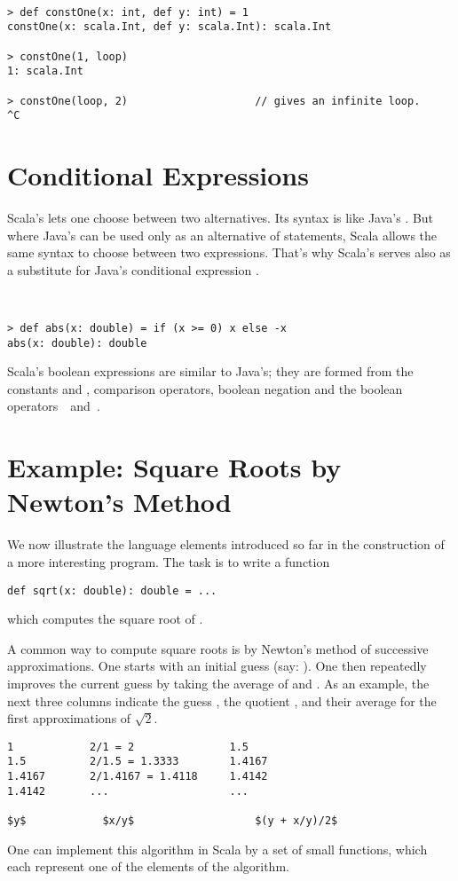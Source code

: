 \example\ 
 
\begin{lstlisting}
> def constOne(x: int, def y: int) = 1
constOne(x: scala.Int, def y: scala.Int): scala.Int

> constOne(1, loop)
1: scala.Int

> constOne(loop, 2)                    // gives an infinite loop.
^C
\end{lstlisting}

\section{Conditional Expressions}

Scala's  lets one choose between two alternatives.  Its
syntax is like Java's . But where Java's 
can be used only as an alternative of statements, Scala allows the
same syntax to choose between two expressions. That's why Scala's
 serves also as a substitute for Java's conditional
expression .

\example\ 

\begin{lstlisting}
> def abs(x: double) = if (x >= 0) x else -x
abs(x: double): double
\end{lstlisting}
Scala's boolean expressions are similar to Java's; they are formed
from the constants
 and
, comparison operators, boolean negation \code{!} and the
boolean operators $\,$\code{&&}$\,$ and $\,$\code{||}.

\section{\label{sec:sqrt}Example: Square Roots by Newton's Method}

We now illustrate the language elements introduced so far in the
construction of a more interesting program. The task is to write a
function
\begin{lstlisting}
def sqrt(x: double): double = ... 
\end{lstlisting}
which computes the square root of .

A common way to compute square roots is by Newton's method of
successive approximations. One starts with an initial guess 
(say: ). One then repeatedly improves the current guess
 by taking the average of  and .  As an
example, the next three columns indicate the guess , the
quotient , and their average for the first approximations of
$\sqrt 2$.
\begin{lstlisting}
1            2/1 = 2               1.5
1.5          2/1.5 = 1.3333        1.4167
1.4167       2/1.4167 = 1.4118     1.4142
1.4142       ...                   ...

$y$            $x/y$                   $(y + x/y)/2$
\end{lstlisting}
One can implement this algorithm in Scala by a set of small functions,
which each represent one of the elements of the algorithm.  

